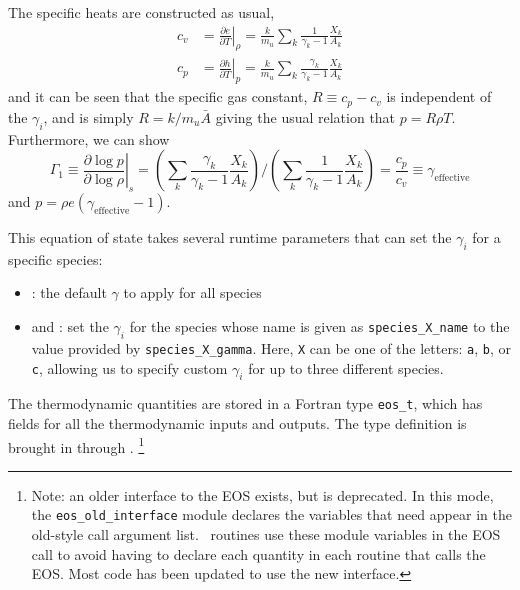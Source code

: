 \begin{itemize}
The specific heats are constructed as usual,
\begin{align}
c_v &= \left . \frac{\partial e}{\partial T} \right |_\rho =
    \frac{k}{m_u} \sum_k \frac{1}{\gamma_k - 1} \frac{X_k}{A_k} \\
c_p &= \left . \frac{\partial h}{\partial T} \right |_p =
    \frac{k}{m_u} \sum_k \frac{\gamma_k}{\gamma_k - 1} \frac{X_k}{A_k}
\end{align}
and it can be seen that the specific gas constant, $R \equiv c_p - c_v$ is
independent of the $\gamma_i$, and is simply $R = k/m_u\bar{A}$ giving the
usual relation that $p = R\rho T$.  Furthermore, we can show
\begin{equation}
\Gamma_1 \equiv \left . \frac{\partial \log p}{\partial \log \rho} \right |_s =
   \left ( \sum_k \frac{\gamma_k}{\gamma_k - 1} \frac{X_k}{A_k} \right ) \bigg /
   \left ( \sum_k \frac{1}{\gamma_k - 1} \frac{X_k}{A_k} \right ) =
\frac{c_p}{c_v} \equiv \gamma_\mathrm{effective}
\end{equation}
and $p = \rho e (\gamma_\mathrm{effective} - 1)$.

This equation of state takes several runtime parameters that can set the
$\gamma_i$ for a specific species:
\begin{itemize}
\item {}: the default $\gamma$ to apply for
  all species
\item {} and : set the $\gamma_i$
  for the species whose name is given as {\tt species\_X\_name} to the
  value provided by {\tt species\_X\_gamma}.  Here, {\tt X} can be one
  of the letters: {\tt a}, {\tt b}, or {\tt c}, allowing us to specify
  custom $\gamma_i$ for up to three different species.
\end{itemize}

\end{itemize}

The thermodynamic quantities are stored in a Fortran type {\tt eos\_t},
which has fields for all the thermodynamic inputs and outputs.  The 
type definition is brought in through .
\footnote{ Note: an older interface to the EOS exists, but is
  deprecated.  In this mode, the {\tt eos\_old\_interface} module declares 
  the variables that need appear in the old-style  call
  argument list.  \maestro\ routines use these module variables in the
  EOS call to avoid having to declare each quantity in each routine
  that calls the EOS.  Most code has been updated to use the new interface.}

